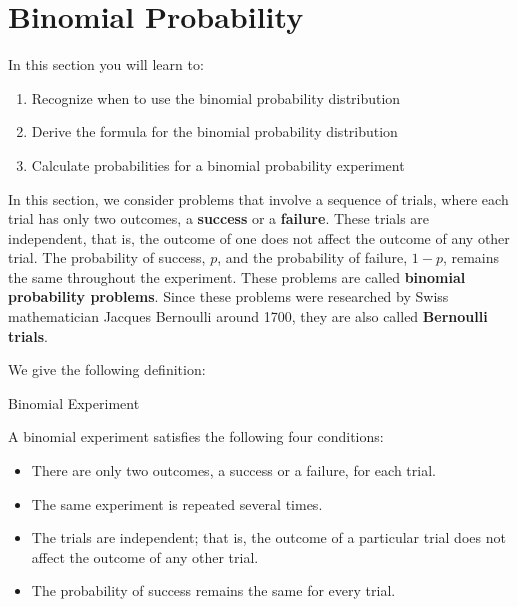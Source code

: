 \section{Binomial Probability}
In this section you will learn to:
\begin{enumerate}
    \item Recognize when to use the binomial probability distribution
    \item Derive the formula for the binomial probability distribution
    \item Calculate probabilities for a binomial probability experiment
\end{enumerate}

In this section, we consider problems that involve a sequence of trials, where each trial has only two outcomes, a \textbf{success} or a \textbf{failure}. These trials are independent, that is, the outcome of one does not affect the outcome of any other trial. The probability of success, \( p \), and the probability of failure, \( 1 - p \), remains the same throughout the experiment. These problems are called \textbf{binomial probability problems}. Since these problems were researched by Swiss mathematician Jacques Bernoulli around 1700, they are also called \textbf{Bernoulli trials}.

We give the following definition:

\begin{summarybox}{Binomial Experiment}

    A binomial experiment satisfies the following four conditions:
    \begin{itemize}
        \item There are only two outcomes, a success or a failure, for each trial.
        \item The same experiment is repeated several times.
        \item The trials are independent; that is, the outcome of a particular trial does not affect the outcome of any other trial.
        \item The probability of success remains the same for every trial.
    \end{itemize}
\end{summarybox}

